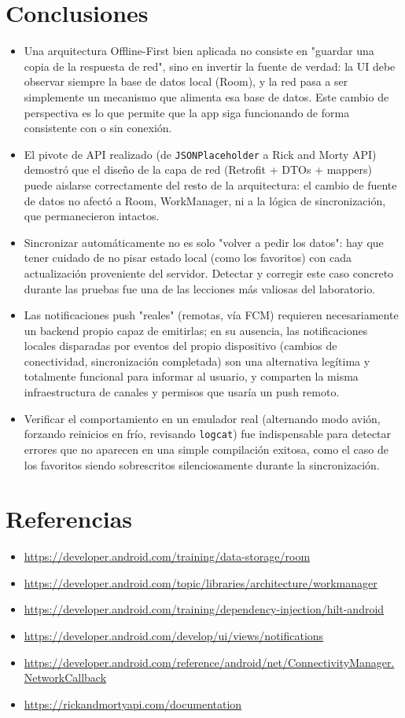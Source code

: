 \documentclass{article}
\begin{document}
	\section{Conclusiones}
	\begin{itemize}
		\item Una arquitectura Offline-First bien aplicada no consiste en "guardar una copia de la respuesta de red", sino en invertir la fuente de verdad: la UI debe observar siempre la base de datos local (Room), y la red pasa a ser simplemente un mecanismo que alimenta esa base de datos. Este cambio de perspectiva es lo que permite que la app siga funcionando de forma consistente con o sin conexión.
		\item El pivote de API realizado (de \texttt{JSONPlaceholder} a Rick and Morty API) demostró que el diseño de la capa de red (Retrofit + DTOs + mappers) puede aislarse correctamente del resto de la arquitectura: el cambio de fuente de datos no afectó a Room, WorkManager, ni a la lógica de sincronización, que permanecieron intactos.
		\item Sincronizar automáticamente no es solo "volver a pedir los datos": hay que tener cuidado de no pisar estado local (como los favoritos) con cada actualización proveniente del servidor. Detectar y corregir este caso concreto durante las pruebas fue una de las lecciones más valiosas del laboratorio.
		\item Las notificaciones push "reales" (remotas, vía FCM) requieren necesariamente un backend propio capaz de emitirlas; en su ausencia, las notificaciones locales disparadas por eventos del propio dispositivo (cambios de conectividad, sincronización completada) son una alternativa legítima y totalmente funcional para informar al usuario, y comparten la misma infraestructura de canales y permisos que usaría un push remoto.
		\item Verificar el comportamiento en un emulador real (alternando modo avión, forzando reinicios en frío, revisando \texttt{logcat}) fue indispensable para detectar errores que no aparecen en una simple compilación exitosa, como el caso de los favoritos siendo sobrescritos silenciosamente durante la sincronización.
	\end{itemize}
	\clearpage

	\section{Referencias}
	\begin{itemize}
		\item \url{https://developer.android.com/training/data-storage/room}
		\item \url{https://developer.android.com/topic/libraries/architecture/workmanager}
		\item \url{https://developer.android.com/training/dependency-injection/hilt-android}
		\item \url{https://developer.android.com/develop/ui/views/notifications}
		\item \url{https://developer.android.com/reference/android/net/ConnectivityManager.NetworkCallback}
		\item \url{https://rickandmortyapi.com/documentation}
	\end{itemize}
\end{document}
